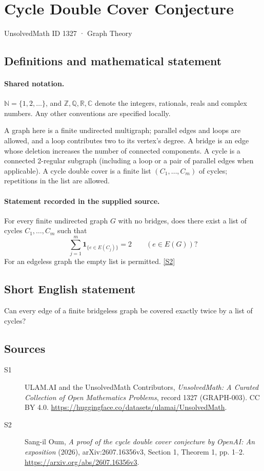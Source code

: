 \documentclass[11pt]{article}
\newcommand{\sref}[2]{\hyperlink{source:#1:#2}{[S#2]}}
\begin{document}
\setcounter{section}{1326}
\section{Cycle Double Cover Conjecture}\label{1327}
{\small\sffamily UnsolvedMath ID 1327 · Graph Theory}
\subsection{Definitions and mathematical statement}

\paragraph{Shared notation.}$\mathbb N=\{1,2,\ldots\}$, and $\mathbb Z,\mathbb Q,\mathbb R,\mathbb C$ denote the integers, rationals, reals and complex numbers. Any other conventions are specified locally.


A graph here is a finite undirected multigraph; parallel edges and loops are allowed, and a loop contributes two to its vertex's degree. A bridge is an edge whose deletion increases the number of connected components. A cycle is a connected 2-regular subgraph (including a loop or a pair of parallel edges when applicable). A cycle double cover is a finite list $(C_1,\ldots,C_m)$ of cycles; repetitions in the list are allowed.
\paragraph{Statement recorded in the supplied source.}
For every finite undirected graph $G$ with no bridges, does there exist a list of cycles $C_1,\ldots,C_m$ such that
\[
 \sum_{j=1}^{m}\mathbf 1_{\{e\in E(C_j)\}}=2\qquad(e\in E(G))?
\]
For an edgeless graph the empty list is permitted. \sref{1327}{2}
\subsection{Short English statement}
Can every edge of a finite bridgeless graph be covered exactly twice by a list of cycles?
\subsection{Sources}
\begin{description}
\item[\hypertarget{source:1327:1}{S1}] ULAM.AI and the UnsolvedMath Contributors, \emph{UnsolvedMath: A Curated Collection of Open Mathematics Problems}, record 1327 (GRAPH-003). CC BY 4.0. \url{https://huggingface.co/datasets/ulamai/UnsolvedMath}.
\item[\hypertarget{source:1327:2}{S2}] Sang-il Oum, \emph{A proof of the cycle double cover conjecture by OpenAI: An exposition} (2026), arXiv:2607.16356v3, Section 1, Theorem 1, pp. 1--2. \url{https://arxiv.org/abs/2607.16356v3}.
\end{description}
\label{end:1327}
\end{document}
